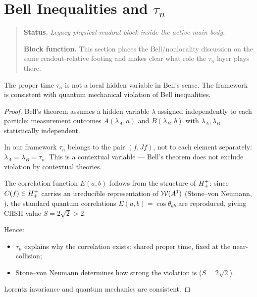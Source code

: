 
\section[Bell Inequalities and tau-n]{Bell Inequalities and \texorpdfstring{$\tau_n$}{tau_n}}
\begin{quote}\small
\noindent\textbf{Status.} \emph{Legacy physical-readout block inside the active main body.}\par
\noindent\textbf{Block function.} This section places the Bell/nonlocality discussion on the same readout-relative footing and makes clear what role the $\tau_n$ layer plays there.
\end{quote}
\label{sec:bell}

\begin{theorem}
\label{thm:bell-consistency}
The proper time $\tau_n$ is not a local hidden variable in Bell's sense.
The framework is consistent with quantum mechanical violation of Bell
inequalities.
\begin{proof}
Bell's theorem assumes a hidden variable $\lambda$ assigned independently
to each particle: measurement outcomes $A(\lambda_A,a)$ and
$B(\lambda_B,b)$ with $\lambda_A,\lambda_B$ statistically independent.

In our framework $\tau_n$ belongs to the pair $(f,Jf)$, not to each
element separately: $\lambda_A=\lambda_B=\tau_n$.
This is a contextual variable --- Bell's theorem does not exclude
violation by contextual theories.

The correlation function $E(a,b)$ follows from the structure of
$H^+_+$: since $C(f)\in H^+_+$ carries an irreducible
representation of $\mathcal{W}(A^1)$ (Stone--von Neumann, \cite{brendecke2026rh}),
the standard quantum correlations $E(a,b)=\cos\theta_{ab}$ are
reproduced, giving CHSH value $S=2\sqrt{2}>2$.

Hence:
\begin{itemize}
  \item $\tau_n$ explains why the correlation exists: shared proper time,
        fixed at the near-collision;
  \item Stone--von Neumann determines how strong the violation is
        ($S=2\sqrt{2}$).
\end{itemize}
Lorentz invariance and quantum mechanics are consistent.
\end{proof}
\end{theorem}

